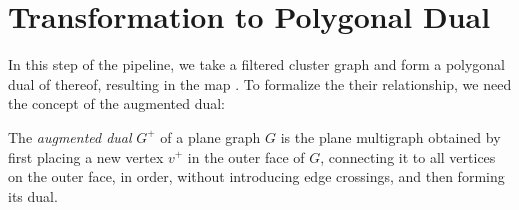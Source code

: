\section{Transformation to Polygonal Dual}
\label{sect:transformation-to-dual}

In this step of the pipeline, we take a filtered cluster graph \clustergraph{} and form a polygonal dual of thereof, resulting in the map \initmap{}.
To formalize the their relationship, we need the concept of the augmented dual:

\begin{definition}
The \emph{augmented dual} $G^+$ of a plane graph $G$ is the plane multigraph obtained by first placing a new vertex $v^+$ in the outer face of $G$, connecting it to all vertices on the outer face, in order, without introducing edge crossings, and then forming its dual.
\label{def:augmented-dual}
\end{definition}

